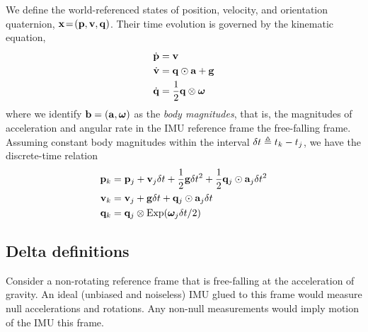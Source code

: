 We define the world-referenced states of position, velocity, and orientation quaternion, ${\bf x}\!=\!({\bf p},{\bf v},{\bf q})$. 
Their time evolution is governed by the kinematic equation,
%
\begin{align}\label{equ:cont_basic}
\dot{{\bf p}} &= {\bf v} \\
\dot{{\bf v}} &= {\bf q}\odot{\bf a} + {\bf g} \\
\dot{{\bf q}} &= \frac12{\bf q}\otimes{{\bm \omega}} 
\end{align}
%
where we identify ${\bf b}=({\bf a},{{\bm \omega}})$ as the \emph{body magnitudes}, that is, the magnitudes of acceleration and angular rate in the IMU reference frame \wrt the free-falling frame.
Assuming constant body magnitudes within the interval $\delta t\triangleq t_k-t_j$, we have the discrete-time relation
%
\begin{align}\label{equ:g_second_order_integration}
\begin{split}
{\bf p}_{k} &= {\bf p}_j + {\bf v}_j\delta t  + \frac12{\bf g}\delta t^2 + \frac12{\bf q}_j\odot{\bf a}_j\delta t^2 \\
{\bf v}_{k} &= {\bf v}_j + {\bf g}\delta t + {\bf q}_j\odot{\bf a}_j\delta t \\
{\bf q}_{k} &= {\bf q}_j\otimes\operatorname*{Exp}({{\bm \omega}}_j\delta t/2) 
\end{split}
\end{align}


\subsection{Delta definitions}

Consider a non-rotating reference frame that is free-falling at the acceleration of gravity. An ideal (unbiased and noiseless) IMU glued to this frame would measure null accelerations and rotations. Any non-null measurements would imply motion of the IMU \wrt this frame.

